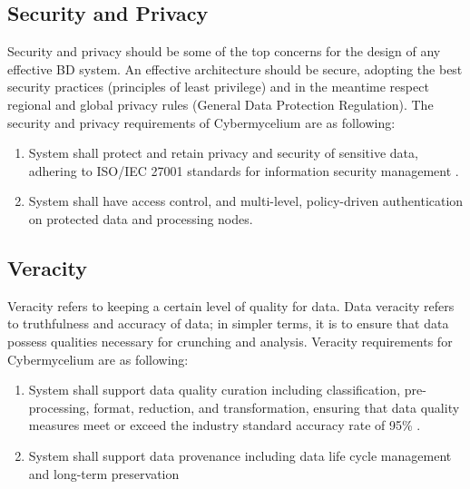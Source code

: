 \documentclass[review]{elsarticle}
\begin{document}
\subsection{Security and Privacy}

Security and privacy should be some of the top concerns for the design of any effective BD system. An effective architecture should be secure, adopting the best security practices (principles of least privilege) and in the meantime respect regional and global privacy rules (General Data Protection Regulation). The security and privacy requirements of Cybermycelium are as following:

\begin{enumerate}[label=\textbf{SaP-\arabic*}]
    \item System shall protect and retain privacy and security of sensitive data, adhering to ISO/IEC 27001 standards for information security management \cite{disterer2013iso}.
    \item System shall have access control, and multi-level, policy-driven authentication on protected data and processing nodes.
\end{enumerate}

\subsection{Veracity}

Veracity refers to keeping a certain level of quality for data. Data veracity refers to truthfulness and accuracy of data; in simpler terms, it is to ensure that data possess qualities necessary for crunching and analysis. Veracity requirements for Cybermycelium are as following: 

\begin{enumerate}[label=\textbf{Ver-\arabic*}]
    \item System shall support data quality curation including classification, pre-processing, format, reduction, and transformation, ensuring that data quality measures meet or exceed the industry standard accuracy rate of 95\% \cite{reis2022fundamentals}.
    \item System shall support data provenance including data life cycle management and long-term preservation
\end{enumerate}

\end{document}
